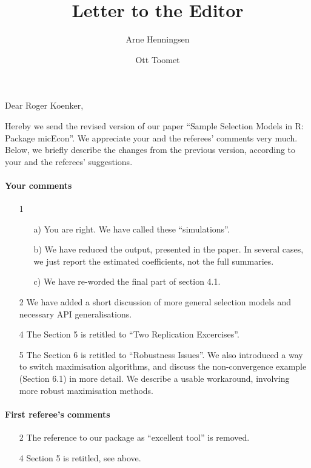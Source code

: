 \documentclass[a4paper]{article}
\title{Letter to the Editor}
\author{Arne Henningsen \and Ott Toomet}
\begin{document}
\maketitle

Dear Roger Koenker,

\bigskip

Hereby we send the revised version of our paper ``Sample Selection
Models in R: Package micEcon''.  We appreciate your and the referees'
comments very much.  Below, we briefly describe the changes from
the previous version, according to your and the referees' suggestions.

\paragraph{Your comments}

\begin{itemize}
\item[1]
  \begin{itemize}
  \item[a)] You are right.  We have called these ``simulations''.
  \item[b)] We have reduced the output, presented in the paper.  In
    several cases, we just report the estimated coefficients, not the
    full summaries.
  \item[c)] We have re-worded the final part of section 4.1.
  \end{itemize}
\item[2] We have added a short discussion of more general selection
  models and necessary API generalisations.
\item[4] The Section 5 is retitled to ``Two Replication Excercises''.
\item[5] The Section 6 is retitled to ``Robustness Issues''.  We also
  introduced a way to switch maximisation algorithms, and discuss the
  non-convergence example (Section 6.1) in more detail.  We describe a
  usable workaround, involving more robust maximisation methods.
\end{itemize}

\paragraph{First referee's comments}

\begin{itemize}
\item[2] The reference to our package as ``excellent tool'' is removed.
\item[4] Section 5 is retitled, see above.
\end{itemize}
\end{document}
